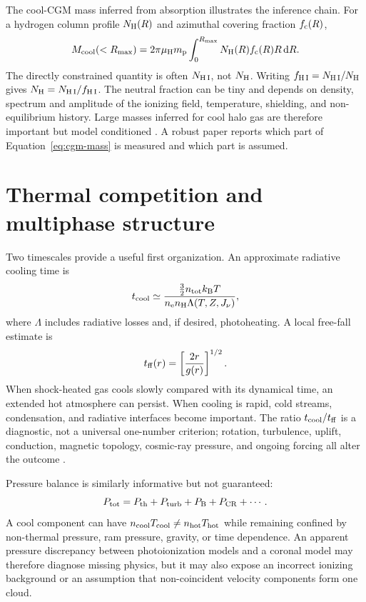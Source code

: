 The cool-CGM mass inferred from absorption illustrates the inference chain.
For a hydrogen column profile $N_{\rm H}(R)$ and azimuthal covering fraction
$f_{\rm c}(R)$,
\begin{equation}
 M_{\rm cool}(<R_{\rm max}) =
 2\pi \mu_{\rm H}m_{\rm p}
 \int_{0}^{R_{\rm max}} N_{\rm H}(R) f_{\rm c}(R)R\,{\rm d}R .
 \label{eq:cgm-mass}
\end{equation}
The directly constrained quantity is often $N_{\rm H\,I}$, not $N_{\rm H}$.
Writing $f_{\rm H\,I}=N_{\rm H\,I}/N_{\rm H}$ gives
$N_{\rm H}=N_{\rm H\,I}/f_{\rm H\,I}$. The neutral fraction can be tiny and
depends on density, spectrum and amplitude of the ionizing field, temperature,
shielding, and non-equilibrium history. Large masses inferred for cool halo
gas are therefore important but model conditioned
\citep{Werk2014,Prochaska2017}. A robust paper reports which part of
Equation~\ref{eq:cgm-mass} is measured and which part is assumed.

\section{Thermal competition and multiphase structure}

Two timescales provide a useful first organization. An approximate radiative
cooling time is
\begin{equation}
 t_{\rm cool} \simeq
 \frac{\tfrac{3}{2}n_{\rm tot}k_{\rm B}T}
      {n_{\rm e}n_{\rm H}\Lambda(T,Z,J_{\nu})},
 \label{eq:cooling-time}
\end{equation}
where $\Lambda$ includes radiative losses and, if desired, photoheating. A
local free-fall estimate is
\begin{equation}
 t_{\rm ff}(r)=\left[\frac{2r}{g(r)}\right]^{1/2}.
 \label{eq:freefall}
\end{equation}
When shock-heated gas cools slowly compared with its dynamical time, an
extended hot atmosphere can persist. When cooling is rapid, cold streams,
condensation, and radiative interfaces become important. The ratio
$t_{\rm cool}/t_{\rm ff}$ is a diagnostic, not a universal one-number
criterion; rotation, turbulence, uplift, conduction, magnetic topology,
cosmic-ray pressure, and ongoing forcing all alter the outcome
\citep{FaucherGiguereOh2023}.

Pressure balance is similarly informative but not guaranteed:
\begin{equation}
 P_{\rm tot}=P_{\rm th}+P_{\rm turb}+P_{\rm B}+P_{\rm CR}+\cdots .
\end{equation}
A cool component can have $n_{\rm cool}T_{\rm cool}\neq
n_{\rm hot}T_{\rm hot}$ while remaining confined by non-thermal pressure,
ram pressure, gravity, or time dependence. An apparent pressure discrepancy
between photoionization models and a coronal model may therefore diagnose
missing physics, but it may also expose an incorrect ionizing background or
an assumption that non-coincident velocity components form one cloud.

